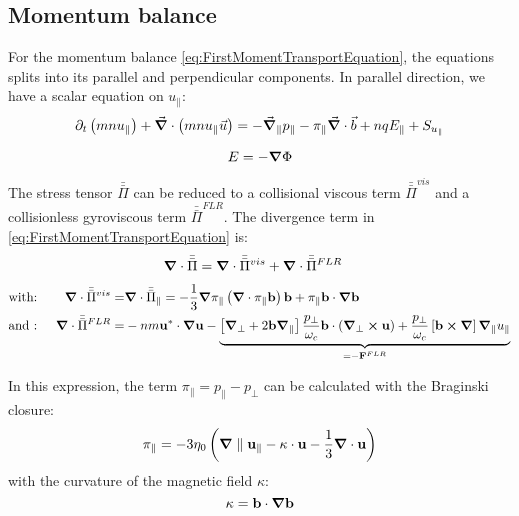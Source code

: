 \subsection{Momentum balance}
For the momentum balance \ref{eq:FirstMomentTransportEquation}, the equations splits into its parallel and perpendicular components. In parallel direction, we have a scalar equation on $u_\parallel$:
\begin{equation}
	\partial_t \left(mnu_\parallel\right) + \vec{\grad}\cdot\left(mnu_\parallel\vec{u}\right) = -\vec{\grad}_\parallel{p_\parallel} - \pi_\parallel\vec{\grad}\cdot\vec{b} + nqE_\parallel + S_{u_\parallel}
\end{equation}

$$ E = -\grad{\Phi}$$

The stress tensor $\bar{\bar{\Pi}}$ can be reduced to a collisional viscous term $\bar{\bar{\Pi}}^{vis}$ and a collisionless gyroviscous term $\bar{\bar{\Pi}}^{FLR}$. The divergence term in \autoref{eq:FirstMomentTransportEquation} is:  
\begin{align}
	\mathbf{\grad}\cdot\bar{\bar{\Pi}} &= \mathbf{\grad}\cdot\bar{\bar{\Pi}}^{vis} + \mathbf{\grad}\cdot\bar{\bar{\Pi}}^{FLR} 
\end{align}
\begin{align}
	&\text{with: }&\mathbf{\grad}\cdot\bar{\bar{\Pi}}^{vis} =& \mathbf{\grad}\cdot\bar{\bar{\Pi}}_\parallel = -\frac{1}{3}\grad\pi_\parallel\left(\mathbf{\grad}\cdot\pi_\parallel\mathbf{b}\right)\mathbf{b} + \pi_\parallel\mathbf{b}\cdot\grad\mathbf{b} \nonumber\\
	&\text{and : }&\mathbf{\grad}\cdot\bar{\bar{\Pi}}^{FLR} =& -nm\mathbf{u}^*\cdot\grad\mathbf{u} - \underbrace{\left[\mathbf{\grad}_\perp + 2\mathbf{b}\mathbf{\grad}_\parallel\right]\frac{p_\perp}{\omega_c}\mathbf{b}\cdot(\mathbf{\grad}_\perp\cross\mathbf{u})+\frac{p_\perp}{\omega_c}\left[\mathbf{b}\cross\mathbf{\grad}\right]\mathbf{\grad}_\parallel u_\parallel}_{=-\mathbf{F}^{FLR}} \nonumber	
\end{align}

In this expression, the term $\pi_\parallel = p_\parallel - p_\perp$ can be calculated with the Braginski closure:
\begin{equation}
	\pi_\parallel = -3\eta_0\left(\grad\parallel\mathbf{u}_\parallel-\kappa\cdot\mathbf{u}-\frac{1}{3}\mathbf{\grad}\cdot\mathbf{u}\right)
\end{equation}
with the curvature of the magnetic field $\kappa$: $$ \kappa = \mathbf{b}\cdot\grad\mathbf{b}$$



